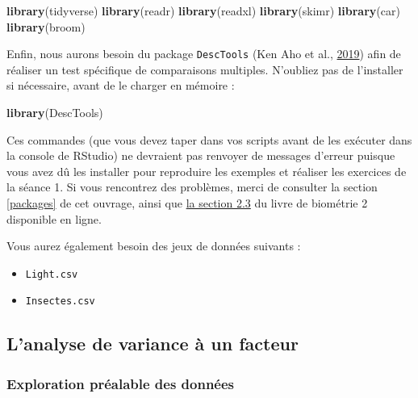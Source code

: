 \documentclass[a4paperpaper,]{article}
\newenvironment{Shaded}{\begin{snugshade}}{\end{snugshade}}
\newcommand{\KeywordTok}[1]{\textcolor[rgb]{0.12,0.11,0.11}{\textbf{#1}}}
\newcommand{\NormalTok}[1]{\textcolor[rgb]{0.12,0.11,0.11}{#1}}
\providecommand{\tightlist}{%
  \setlength{\itemsep}{0pt}\setlength{\parskip}{0pt}}
\begin{document}
\begin{Shaded}
\begin{Highlighting}[]
\KeywordTok{library}\NormalTok{(tidyverse)}
\KeywordTok{library}\NormalTok{(readr)}
\KeywordTok{library}\NormalTok{(readxl)}
\KeywordTok{library}\NormalTok{(skimr)}
\KeywordTok{library}\NormalTok{(car)}
\KeywordTok{library}\NormalTok{(broom)}
\end{Highlighting}
\end{Shaded}

Enfin, nous aurons besoin du package \texttt{DescTools} (Ken Aho et al., \protect\hyperlink{ref-R-DescTools}{2019}) afin de réaliser un test spécifique de comparaisons multiples. N'oubliez pas de l'installer si nécessaire, avant de le charger en mémoire :

\begin{Shaded}
\begin{Highlighting}[]
\KeywordTok{library}\NormalTok{(DescTools)}
\end{Highlighting}
\end{Shaded}

Ces commandes (que vous devez taper dans vos scripts avant de les exécuter dans la console de RStudio) ne devraient pas renvoyer de messages d'erreur puisque vous avez dû les installer pour reproduire les exemples et réaliser les exercices de la séance 1. Si vous rencontrez des problèmes, merci de consulter la section \ref{packages} de cet ouvrage, ainsi que \href{https://besibo.github.io/Biometrie2/bases.html\#charger-un-package-en-memoire}{la section 2.3} du livre de biométrie 2 disponible en ligne.

Vous aurez également besoin des jeux de données suivants :

\begin{itemize}
\tightlist
\item
  \texttt{Light.csv}
\item
  \texttt{Insectes.csv}
\end{itemize}

\hypertarget{lanalyse-de-variance-a-un-facteur}{%
\subsection{L'analyse de variance à un facteur}\label{lanalyse-de-variance-a-un-facteur}}

\hypertarget{exploration-prealable-des-donnees-1}{%
\subsubsection{Exploration préalable des données}\label{exploration-prealable-des-donnees-1}}
\end{document}
